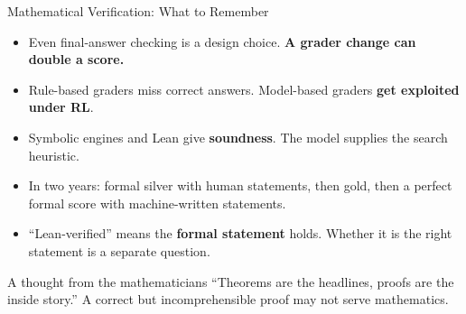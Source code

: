 \begin{frame}{Mathematical Verification: What to Remember}
    \begin{itemize}\itemsep0.6em
        \item Even final-answer checking is a design choice. \textbf{A grader change can double a score.}
        \item Rule-based graders miss correct answers. Model-based graders \textbf{get exploited under RL}.
        \item Symbolic engines and Lean give \textbf{soundness}. The model supplies the search heuristic.
        \item In two years: formal silver with human statements, then gold, then a perfect formal score with machine-written statements.
        \item ``Lean-verified'' means the \textbf{formal statement} holds. Whether it is the right statement is a separate question.
    \end{itemize}
    \vspace{0.3em}
    \begin{block}{A thought from the mathematicians}
        ``Theorems are the headlines, proofs are the inside story.'' A correct but incomprehensible proof may not serve mathematics.
    \end{block}
    \vspace{0.2em}
\end{frame}
